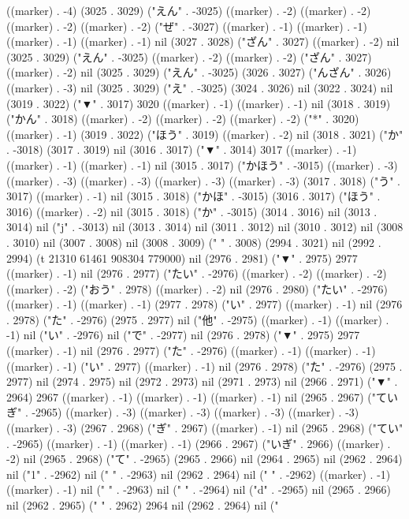((marker) . -4) (3025 . 3029) ("えん" . -3025) ((marker) . -2) ((marker) . -2) ((marker) . -2) ((marker) . -2) ("ぜ" . -3027) ((marker) . -1) ((marker) . -1) ((marker) . -1) ((marker) . -1) nil (3027 . 3028) ("ざん" . 3027) ((marker) . -2) nil (3025 . 3029) ("えん" . -3025) ((marker) . -2) ((marker) . -2) ("ざん" . 3027) ((marker) . -2) nil (3025 . 3029) ("えん" . -3025) (3026 . 3027) ("んざん" . 3026) ((marker) . -3) nil (3025 . 3029) ("え" . -3025) (3024 . 3026) nil (3022 . 3024) nil (3019 . 3022) ("▼" . 3017) 3020 ((marker) . -1) ((marker) . -1) nil (3018 . 3019) ("かん" . 3018) ((marker) . -2) ((marker) . -2) ((marker) . -2) ("*" . 3020) ((marker) . -1) (3019 . 3022) ("ほう" . 3019) ((marker) . -2) nil (3018 . 3021) ("か" . -3018) (3017 . 3019) nil (3016 . 3017) ("▼" . 3014) 3017 ((marker) . -1) ((marker) . -1) ((marker) . -1) nil (3015 . 3017) ("かほう" . -3015) ((marker) . -3) ((marker) . -3) ((marker) . -3) ((marker) . -3) ((marker) . -3) (3017 . 3018) ("う" . 3017) ((marker) . -1) nil (3015 . 3018) ("かほ" . -3015) (3016 . 3017) ("ほう" . 3016) ((marker) . -2) nil (3015 . 3018) ("か" . -3015) (3014 . 3016) nil (3013 . 3014) nil ("j" . -3013) nil (3013 . 3014) nil (3011 . 3012) nil (3010 . 3012) nil (3008 . 3010) nil (3007 . 3008) nil (3008 . 3009) ("  " . 3008) (2994 . 3021) nil (2992 . 2994) (t 21310 61461 908304 779000) nil (2976 . 2981) ("▼" . 2975) 2977 ((marker) . -1) nil (2976 . 2977) ("たい" . -2976) ((marker) . -2) ((marker) . -2) ((marker) . -2) ("おう" . 2978) ((marker) . -2) nil (2976 . 2980) ("たい" . -2976) ((marker) . -1) ((marker) . -1) (2977 . 2978) ("い" . 2977) ((marker) . -1) nil (2976 . 2978) ("た" . -2976) (2975 . 2977) nil ("他" . -2975) ((marker) . -1) ((marker) . -1) nil ("い" . -2976) nil ("で" . -2977) nil (2976 . 2978) ("▼" . 2975) 2977 ((marker) . -1) nil (2976 . 2977) ("た" . -2976) ((marker) . -1) ((marker) . -1) ((marker) . -1) ("い" . 2977) ((marker) . -1) nil (2976 . 2978) ("た" . -2976) (2975 . 2977) nil (2974 . 2975) nil (2972 . 2973) nil (2971 . 2973) nil (2966 . 2971) ("▼" . 2964) 2967 ((marker) . -1) ((marker) . -1) ((marker) . -1) nil (2965 . 2967) ("ていぎ" . -2965) ((marker) . -3) ((marker) . -3) ((marker) . -3) ((marker) . -3) ((marker) . -3) (2967 . 2968) ("ぎ" . 2967) ((marker) . -1) nil (2965 . 2968) ("てい" . -2965) ((marker) . -1) ((marker) . -1) (2966 . 2967) ("いぎ" . 2966) ((marker) . -2) nil (2965 . 2968) ("て" . -2965) (2965 . 2966) nil (2964 . 2965) nil (2962 . 2964) nil ("1" . -2962) nil (" " . -2963) nil (2962 . 2964) nil ("
" . -2962) ((marker) . -1) ((marker) . -1) nil (" " . -2963) nil (" " . -2964) nil ("d" . -2965) nil (2965 . 2966) nil (2962 . 2965) ("  " . 2962) 2964 nil (2962 . 2964) nil ("
